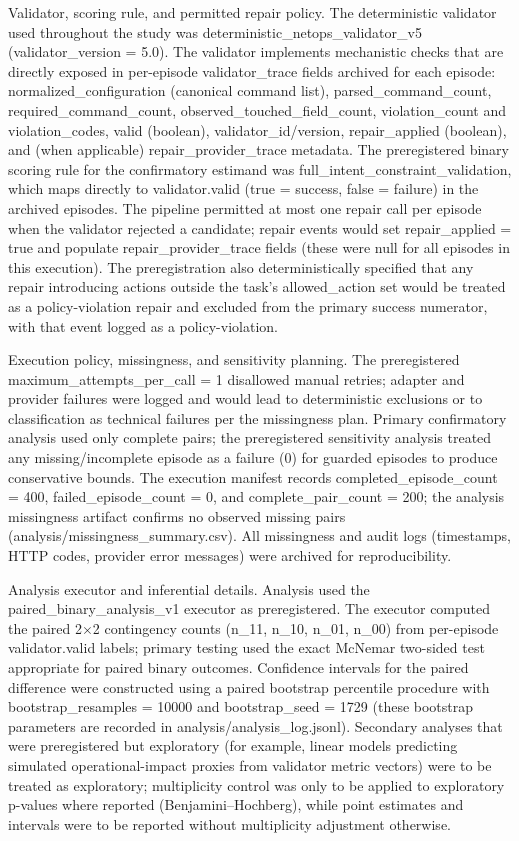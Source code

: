 \documentclass[conference]{IEEEtran}
\begin{document}
Validator, scoring rule, and permitted repair policy. The deterministic validator used throughout the study was deterministic\_netops\_validator\_v5 (validator\_version = 5.0). The validator implements mechanistic checks that are directly exposed in per-episode validator\_trace fields archived for each episode: normalized\_configuration (canonical command list), parsed\_command\_count, required\_command\_count, observed\_touched\_field\_count, violation\_count and violation\_codes, valid (boolean), validator\_id/version, repair\_applied (boolean), and (when applicable) repair\_provider\_trace metadata. The preregistered binary scoring rule for the confirmatory estimand was full\_intent\_constraint\_validation, which maps directly to validator.valid (true = success, false = failure) in the archived episodes. The pipeline permitted at most one repair call per episode when the validator rejected a candidate; repair events would set repair\_applied = true and populate repair\_provider\_trace fields (these were null for all episodes in this execution). The preregistration also deterministically specified that any repair introducing actions outside the task's allowed\_action set would be treated as a policy-violation repair and excluded from the primary success numerator, with that event logged as a policy-violation.

Execution policy, missingness, and sensitivity planning. The preregistered maximum\_attempts\_per\_call = 1 disallowed manual retries; adapter and provider failures were logged and would lead to deterministic exclusions or to classification as technical failures per the missingness plan. Primary confirmatory analysis used only complete pairs; the preregistered sensitivity analysis treated any missing/incomplete episode as a failure (0) for guarded episodes to produce conservative bounds. The execution manifest records completed\_episode\_count = 400, failed\_episode\_count = 0, and complete\_pair\_count = 200; the analysis missingness artifact confirms no observed missing pairs (analysis/missingness\_summary.csv). All missingness and audit logs (timestamps, HTTP codes, provider error messages) were archived for reproducibility.

Analysis executor and inferential details. Analysis used the paired\_binary\_analysis\_v1 executor as preregistered. The executor computed the paired 2\ensuremath{\times}2 contingency counts (n\_11, n\_10, n\_01, n\_00) from per-episode validator.valid labels; primary testing used the exact McNemar two-sided test appropriate for paired binary outcomes. Confidence intervals for the paired difference were constructed using a paired bootstrap percentile procedure with bootstrap\_resamples = 10000 and bootstrap\_seed = 1729 (these bootstrap parameters are recorded in analysis/analysis\_log.jsonl). Secondary analyses that were preregistered but exploratory (for example, linear models predicting simulated operational-impact proxies from validator metric vectors) were to be treated as exploratory; multiplicity control was only to be applied to exploratory p-values where reported (Benjamini--Hochberg), while point estimates and intervals were to be reported without multiplicity adjustment otherwise.
\end{document}
